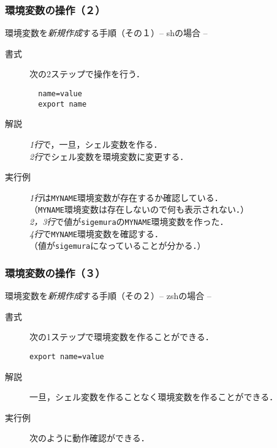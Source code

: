 \documentclass{beamer}                 %
\begin{document}
\begin{frame}[fragile]
  \frametitle{環境変数の操作（２）}
  環境変数を\emph{新規作成}する手順（その１）-- shの場合 --
\begin{description}
\item[書式] 次の2ステップで操作を行う．
\begin{lstlisting}
  name=value
  export name
\end{lstlisting}
\item[解説]
  \emph{1行}で，一旦，シェル変数を作る．\\
  \emph{2行}でシェル変数を環境変数に変更する．
\item[実行例]
  \emph{1行}は\texttt{MYNAME}環境変数が存在するか確認している．\\
  （\texttt{MYNAME}環境変数は存在しないので何も表示されない．）\\
  \emph{2，3行}で値が\texttt{sigemura}の\texttt{MYNAME}環境変数を作った．\\
  \emph{4行}で\texttt{MYNAME}環境変数を確認する．\\
  （値が\texttt{sigemura}になっていることが分かる．）
\end{description}
\end{frame}

\begin{frame}[fragile]
  \frametitle{環境変数の操作（３）}
  環境変数を\emph{新規作成}する手順（その２）-- zshの場合 --
\begin{description}
\item[書式]
  次の1ステップで環境変数を作ることができる．
\begin{lstlisting}[numbers=none]
  export name=value
\end{lstlisting}
\item[解説]
  一旦，シェル変数を作ることなく環境変数を作ることができる．
\item[実行例]
  次のように動作確認ができる．
\end{description}
\end{frame}
\end{document}
